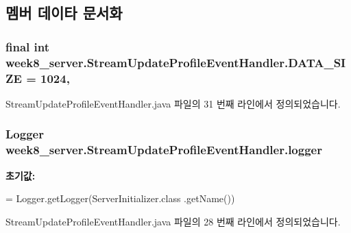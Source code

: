 \subsection{멤버 데이타 문서화}
\hypertarget{classweek8__server_1_1_stream_update_profile_event_handler_aa635f419e6b73e10089f152538ce0b51}{
\subsubsection[{D\-A\-T\-A\-\_\-\-S\-I\-Z\-E}]{\setlength{\rightskip}{0pt plus 5cm}final int week8\-\_\-server.\-Stream\-Update\-Profile\-Event\-Handler.\-D\-A\-T\-A\-\_\-\-S\-I\-Z\-E = 1024\hspace{0.3cm}{\ttfamily [static]}, {\ttfamily [private]}}}\label{classweek8__server_1_1_stream_update_profile_event_handler_aa635f419e6b73e10089f152538ce0b51}


Stream\-Update\-Profile\-Event\-Handler.\-java 파일의 31 번째 라인에서 정의되었습니다.

\hypertarget{classweek8__server_1_1_stream_update_profile_event_handler_ad704bc0908f0f6b43b7cc21887990f0e}{
\subsubsection[{logger}]{\setlength{\rightskip}{0pt plus 5cm}Logger week8\-\_\-server.\-Stream\-Update\-Profile\-Event\-Handler.\-logger\hspace{0.3cm}{\ttfamily [static]}}}\label{classweek8__server_1_1_stream_update_profile_event_handler_ad704bc0908f0f6b43b7cc21887990f0e}
{\bfseries 초기값\-:}
\begin{DoxyCode}
= Logger.getLogger(ServerInitializer.class
            .getName())
\end{DoxyCode}


Stream\-Update\-Profile\-Event\-Handler.\-java 파일의 28 번째 라인에서 정의되었습니다.

